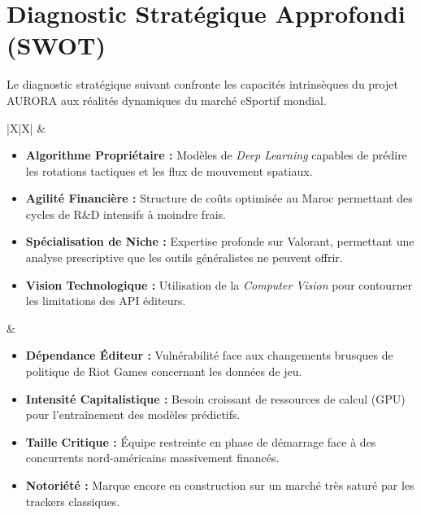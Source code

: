 \documentclass[a4paper,11pt]{article}
\begin{document}
\newpage

\section{Diagnostic Stratégique Approfondi (SWOT)}

Le diagnostic stratégique suivant confronte les capacités intrinsèques du projet AURORA aux réalités dynamiques du marché eSportif mondial.

\begin{table}[h!]
\centering
\small
\renewcommand{\arraystretch}{1.5}
\begin{tabularx}{\textwidth}{|X|X|}
\hline
{}  &  \\ \hline
\begin{itemize}[leftmargin=*, nosep]
    \item \textbf{Algorithme Propriétaire :} Modèles de \textit{Deep Learning} capables de prédire les rotations tactiques et les flux de mouvement spatiaux.
    \item \textbf{Agilité Financière :} Structure de coûts optimisée au Maroc permettant des cycles de R\&D intensifs à moindre frais.
    \item \textbf{Spécialisation de Niche :} Expertise profonde sur Valorant, permettant une analyse prescriptive que les outils généralistes ne peuvent offrir.
    \item \textbf{Vision Technologique :} Utilisation de la \textit{Computer Vision} pour contourner les limitations des API éditeurs.
\end{itemize} & 
\begin{itemize}[leftmargin=*, nosep]
    \item \textbf{Dépendance Éditeur :} Vulnérabilité face aux changements brusques de politique de Riot Games concernant les données de jeu.
    \item \textbf{Intensité Capitalistique :} Besoin croissant de ressources de calcul (GPU) pour l'entraînement des modèles prédictifs.
    \item \textbf{Taille Critique :} Équipe restreinte en phase de démarrage face à des concurrents nord-américains massivement financés.
    \item \textbf{Notoriété :} Marque encore en construction sur un marché très saturé par les trackers classiques.

\end{itemize}
\end{tabularx}
\end{table}
\end{document}
